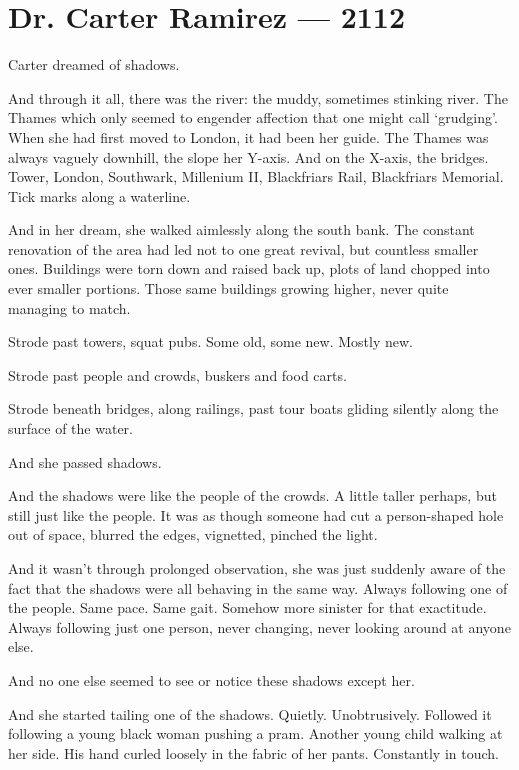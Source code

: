 \hypertarget{dr-carter-ramirez-2112}{%
\chapter*{Dr. Carter Ramirez — 2112}\label{dr-carter-ramirez-2112}}

Carter dreamed of shadows.

And through it all, there was the river: the muddy, sometimes stinking river. The Thames which only seemed to engender affection that one might call `grudging'. When she had first moved to London, it had been her guide. The Thames was always vaguely downhill, the slope her Y-axis. And on the X-axis, the bridges. Tower, London, Southwark, Millenium II, Blackfriars Rail, Blackfriars Memorial. Tick marks along a waterline.

And in her dream, she walked aimlessly along the south bank. The constant renovation of the area had led not to one great revival, but countless smaller ones. Buildings were torn down and raised back up, plots of land chopped into ever smaller portions. Those same buildings growing higher, never quite managing to match.

Strode past towers, squat pubs. Some old, some new. Mostly new.

Strode past people and crowds, buskers and food carts.

Strode beneath bridges, along railings, past tour boats gliding silently along the surface of the water.

And she passed shadows.

And the shadows were like the people of the crowds. A little taller perhaps, but still just like the people. It was as though someone had cut a person-shaped hole out of space, blurred the edges, vignetted, pinched the light.

And it wasn't through prolonged observation, she was just suddenly aware of the fact that the shadows were all behaving in the same way. Always following one of the people. Same pace. Same gait. Somehow more sinister for that exactitude. Always following just one person, never changing, never looking around at anyone else.

And no one else seemed to see or notice these shadows except her.

And she started tailing one of the shadows. Quietly. Unobtrusively. Followed it following a young black woman pushing a pram. Another young child walking at her side. His hand curled loosely in the fabric of her pants. Constantly in touch.

